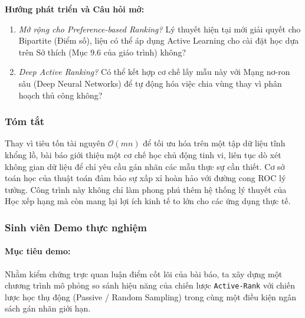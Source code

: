 \begin{tcolorbox}\textbf{Hướng phát triển và Câu hỏi mở:}\bfseries
  \begin{enumerate}
    \item \textit{Mở rộng cho Preference-based Ranking?} Lý thuyết hiện tại mới giải quyết cho Bipartite (Điểm số), liệu có thể áp dụng Active Learning cho cài đặt học dựa trên Sở thích (Mục 9.6 của giáo trình) không?
    \item \textit{Deep Active Ranking?} Có thể kết hợp cơ chế lấy mẫu này với Mạng nơ-ron sâu (Deep Neural Networks) để tự động hóa việc chia vùng thay vì phân hoạch thủ công không?
  \end{enumerate}
\end{tcolorbox}

\subsubsection{Tóm tắt}
Thay vì tiêu tốn tài nguyên $\mathcal{O}(mn)$ để tối ưu hóa trên một tập dữ liệu tĩnh khổng lồ, bài báo giới thiệu một cơ chế học chủ động tinh vi, liên tục dò xét không gian dữ liệu để chỉ yêu cầu gán nhãn các mẫu thực sự cần thiết. 
Cơ sở toán học của thuật toán đảm bảo sự xấp xỉ hoàn hảo với đường cong ROC lý tưởng. Công trình này không chỉ làm phong phú thêm hệ thống lý thuyết của Học xếp hạng mà còn mang lại lợi ích kinh tế to lớn cho các ứng dụng thực tế.

\subsubsection{Sinh viên Demo thực nghiệm}
\paragraph{Mục tiêu demo:}
Nhằm kiểm chứng trực quan luận điểm cốt lõi của bài báo, ta xây dựng một chương trình mô phỏng so sánh hiệu năng của chiến lược \texttt{Active-Rank} với chiến lược học thụ động (Passive / Random Sampling) trong cùng một điều kiện ngân sách gán nhãn giới hạn.

